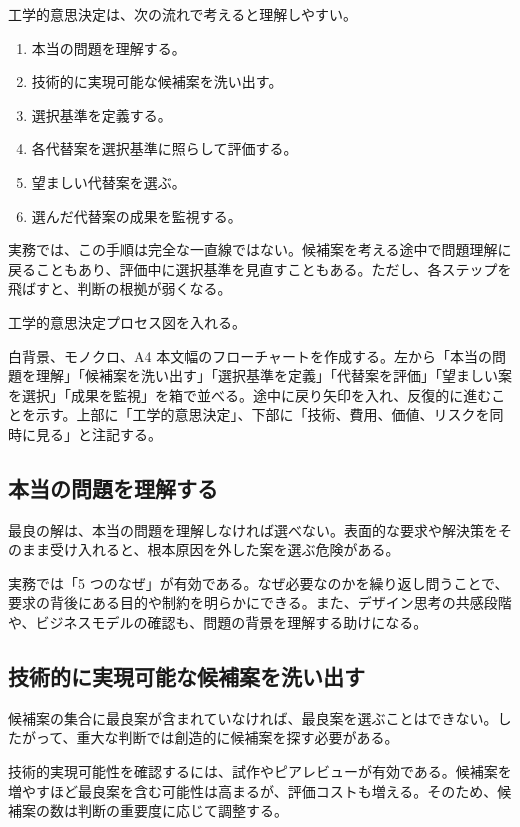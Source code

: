 \documentclass[a4paper,11pt]{article}
\begin{document}
工学的意思決定は、次の流れで考えると理解しやすい。
\begin{enumerate}
  \item 本当の問題を理解する。
  \item 技術的に実現可能な候補案を洗い出す。
  \item 選択基準を定義する。
  \item 各代替案を選択基準に照らして評価する。
  \item 望ましい代替案を選ぶ。
  \item 選んだ代替案の成果を監視する。
\end{enumerate}

実務では、この手順は完全な一直線ではない。候補案を考える途中で問題理解に戻ることもあり、評価中に選択基準を見直すこともある。ただし、各ステップを飛ばすと、判断の根拠が弱くなる。

\begin{todobox}
工学的意思決定プロセス図を入れる。
\end{todobox}
\begin{promptbox}
白背景、モノクロ、A4 本文幅のフローチャートを作成する。左から「本当の問題を理解」「候補案を洗い出す」「選択基準を定義」「代替案を評価」「望ましい案を選択」「成果を監視」を箱で並べる。途中に戻り矢印を入れ、反復的に進むことを示す。上部に「工学的意思決定」、下部に「技術、費用、価値、リスクを同時に見る」と注記する。
\end{promptbox}

\subsection{本当の問題を理解する}

最良の解は、本当の問題を理解しなければ選べない。表面的な要求や解決策をそのまま受け入れると、根本原因を外した案を選ぶ危険がある。

実務では「5 つのなぜ」が有効である。なぜ必要なのかを繰り返し問うことで、要求の背後にある目的や制約を明らかにできる。また、デザイン思考の共感段階や、ビジネスモデルの確認も、問題の背景を理解する助けになる。

\subsection{技術的に実現可能な候補案を洗い出す}

候補案の集合に最良案が含まれていなければ、最良案を選ぶことはできない。したがって、重大な判断では創造的に候補案を探す必要がある。

技術的実現可能性を確認するには、試作やピアレビューが有効である。候補案を増やすほど最良案を含む可能性は高まるが、評価コストも増える。そのため、候補案の数は判断の重要度に応じて調整する。
\end{document}
